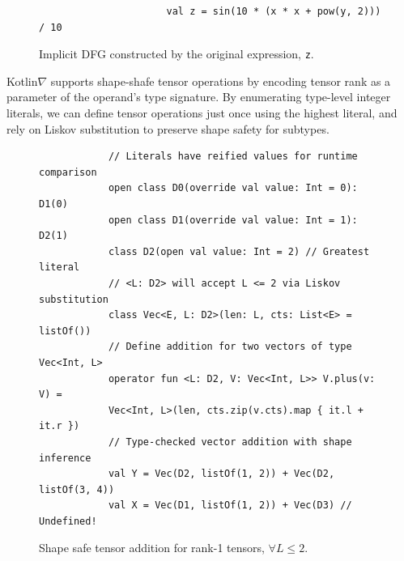 \documentclass{article}
\newcommand{\squeezeup}{\vspace{-2.5mm}}
\begin{document}
    \squeezeup\begin{figure}[!htb]
                  \begin{verbatim}
                      val z = sin(10 * (x * x + pow(y, 2))) / 10
                  \end{verbatim}
                  \squeezeup\centering
                  \squeezeup\squeezeup\squeezeup\caption{Implicit DFG constructed by the original expression, \texttt{z}.}
    \end{figure}

    \squeezeup Kotlin$\nabla$ supports shape-shafe tensor operations by encoding tensor rank as a parameter of the operand's type signature. By enumerating type-level integer literals, we can define tensor operations just once using the highest literal, and rely on Liskov substitution to preserve shape safety for subtypes.

    \begin{figure}[!htb]
        \begin{verbatim}
            // Literals have reified values for runtime comparison
            open class D0(override val value: Int = 0): D1(0)
            open class D1(override val value: Int = 1): D2(1)
            class D2(open val value: Int = 2) // Greatest literal
            // <L: D2> will accept L <= 2 via Liskov substitution
            class Vec<E, L: D2>(len: L, cts: List<E> = listOf())
            // Define addition for two vectors of type Vec<Int, L>
            operator fun <L: D2, V: Vec<Int, L>> V.plus(v: V) =
            Vec<Int, L>(len, cts.zip(v.cts).map { it.l + it.r })
            // Type-checked vector addition with shape inference
            val Y = Vec(D2, listOf(1, 2)) + Vec(D2, listOf(3, 4))
            val X = Vec(D1, listOf(1, 2)) + Vec(D3) // Undefined!
        \end{verbatim}
        \squeezeup\squeezeup\caption{Shape safe tensor addition for rank-1 tensors, $\forall L\leq2.$}\squeezeup
    \end{figure}
\end{document}
